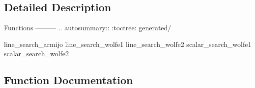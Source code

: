 \subsection{Detailed Description}
\begin{DoxyVerb}Functions
---------
.. autosummary::
   :toctree: generated/

line_search_armijo
line_search_wolfe1
line_search_wolfe2
scalar_search_wolfe1
scalar_search_wolfe2\end{DoxyVerb}
 

\subsection{Function Documentation}
\hypertarget{namespacescipy_1_1optimize_1_1linesearch_a9ffcf875a3c5f400ca81ffc62bfe6202}{}

